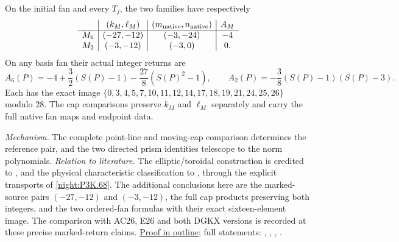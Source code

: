 On the initial fan and every $T_j$, the two families have respectively
\[
\begin{array}{c|c|c|c}
 & (k_M,\ell_M)&(m_{\rm native},n_{\rm native})&A_M\\\hline
M_6&(-27,-12)&(-3,-24)&-4\\
M_2&(-3,-12)&(-3,0)&0.
\end{array}
\]
On any basis fan their actual integer returns are
\[
 A_6(P)=-4+\frac32(S(P)-1)-\frac{27}{8}(S(P)^2-1),\qquad
 A_2(P)=-\frac38(S(P)-1)(S(P)-3).
\]
Each has the exact image
$\{0,3,4,5,7,10,11,12,14,17,18,19,21,24,25,26\}$ modulo $28$.
The cap comparisons preserve $k_M$ and $\ell_M$ separately and
carry the full native fan maps and endpoint data.

\textit{Mechanism.} The complete point-line and moving-cap comparison determines
the reference pair, and the two directed prism identities telescope to the norm polynomials.
\textit{Relation to literature.} The elliptic/toroidal construction is credited to \cite[Section~2 and Remark~8.5]{Engel2026}, and the physical characteristic classification to \cite[Theorem~4.9 and Lemma~6.2]{Jin2026}, through the explicit transports of \cref{night:P3K.68}. The additional conclusions here are the marked-source pairs $(-27,-12)$ and $(-3,-12)$, the full cap products preserving both integers, and the two ordered-fan formulas with their exact sixteen-element image. The comparison with AC26, E26 and both DGKX versions is recorded at these precise marked-return claims.
\hyperlink{outline-IV-E}{Proof in outline}; full statements: , , , .

\hypertarget{main-IV-F}{}
